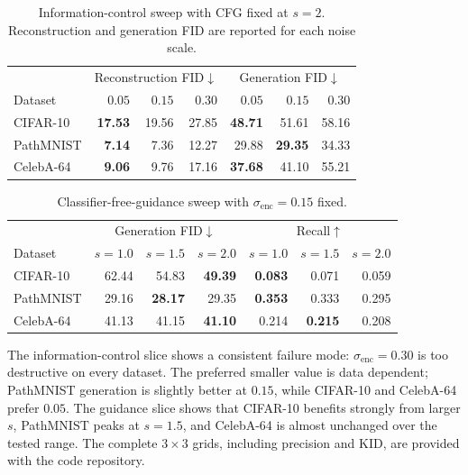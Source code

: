 \documentclass{article}
\begin{document}
\begin{table}[H]
\centering
\scriptsize
\caption{Information-control sweep with CFG fixed at $s=2$. Reconstruction and generation FID are reported for each noise scale.}
\label{tab:noise-cross}
\setlength{\tabcolsep}{4.2pt}
\begin{tabular}{lrrr|rrr}
\toprule
& \multicolumn{3}{c|}{Reconstruction FID$\downarrow$} & \multicolumn{3}{c}{Generation FID$\downarrow$} \\
Dataset & $0.05$ & $0.15$ & $0.30$ & $0.05$ & $0.15$ & $0.30$ \\
\midrule
CIFAR-10 & \textbf{17.53} & 19.56 & 27.85 & \textbf{48.71} & 51.61 & 58.16 \\
PathMNIST & \textbf{7.14} & 7.36 & 12.27 & 29.88 & \textbf{29.35} & 34.33 \\
CelebA-64 & \textbf{9.06} & 9.76 & 17.16 & \textbf{37.68} & 41.10 & 55.21 \\
\bottomrule
\end{tabular}
\end{table}

\begin{table}[H]
\centering
\scriptsize
\caption{Classifier-free-guidance sweep with $\sigma_{\mathrm{enc}}=0.15$ fixed.}
\label{tab:cfg-cross}
\setlength{\tabcolsep}{4.2pt}
\begin{tabular}{lrrr|rrr}
\toprule
& \multicolumn{3}{c|}{Generation FID$\downarrow$} & \multicolumn{3}{c}{Recall$\uparrow$} \\
Dataset & $s=1.0$ & $s=1.5$ & $s=2.0$ & $s=1.0$ & $s=1.5$ & $s=2.0$ \\
\midrule
CIFAR-10 & 62.44 & 54.83 & \textbf{49.39} & \textbf{0.083} & 0.071 & 0.059 \\
PathMNIST & 29.16 & \textbf{28.17} & 29.35 & \textbf{0.353} & 0.333 & 0.295 \\
CelebA-64 & 41.13 & 41.15 & \textbf{41.10} & 0.214 & \textbf{0.215} & 0.208 \\
\bottomrule
\end{tabular}
\end{table}

The information-control slice shows a consistent failure mode: $\sigma_{\mathrm{enc}}=0.30$ is too destructive on every dataset. The preferred smaller value is data dependent; PathMNIST generation is slightly better at $0.15$, while CIFAR-10 and CelebA-64 prefer $0.05$. The guidance slice shows that CIFAR-10 benefits strongly from larger $s$, PathMNIST peaks at $s=1.5$, and CelebA-64 is almost unchanged over the tested range. The complete $3\times3$ grids, including precision and KID, are provided with the code repository.
\end{document}
